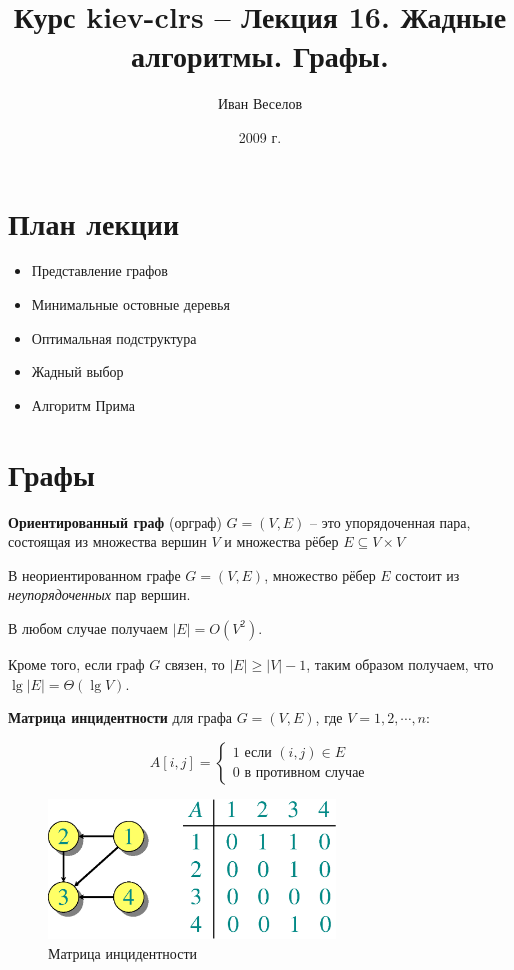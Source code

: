 \documentclass[a4paper,11pt]{article}
\author{Иван Веселов}
\title{Курс kiev-clrs -- Лекция 16. Жадные алгоритмы. Графы.}
\date{2009 г.}
\begin{document}
\maketitle
\tableofcontents
\newpage

\setlength{\parskip}{1ex plus 0.5ex minus 0.2ex}

\section{План лекции}
\begin{itemize}
\item Представление графов
\item Минимальные остовные деревья
\item Оптимальная подструктура
\item Жадный выбор
\item Алгоритм Прима
\end{itemize}

\section{Графы}

\textbf{Ориентированный граф} (орграф) $G = (V, E)$ -- это упорядоченная пара,
состоящая из множества вершин $V$ и множества рёбер $E \subseteq V \times V$

В неориентированном графе $G = (V, E)$, множество рёбер $E$ состоит из
\emph{неупорядоченных} пар вершин.

В любом случае получаем $|E| = O(V^2)$.

Кроме того, если граф $G$ связен, то $ |E| \geqslant |V| - 1$, таким образом получаем, что
$\lg |E| = \Theta(\lg V)$.

\textbf{Матрица инцидентности} для графа $G = (V, E)$, где $V = 1, 2, \cdots, n$:

$$
A[i, j] = \begin{cases}
  1 \text{ если } (i, j) \in E \\
  0 \text{ в противном случае}
\end{cases}
$$

\begin{figure}[ht]
  \centering
  \includegraphics[width=3in]{lecture16/adjacency-matrix.eps}
  \caption{Матрица инцидентности}
  \label{fig:adjacency}
\end{figure}
\end{document}
